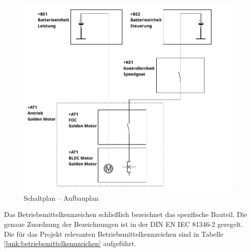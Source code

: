 \begin{figure}[!ht]
	\begin{center}
		\includegraphics[width=1\textwidth]{img/3_schaltplan/sp_aufbauplan_1.png}
		\caption{Schaltplan – Aufbauplan}
		\label{img_3_2:aufbauplan:1}
	\end{center}
\end{figure}


Das Betriebsmittelkennzeichen schließlich bezeichnet das spezifische Bauteil. Die genaue Zuordnung der Bezeichnungen ist in der DIN EN IEC 81346-2 geregelt. Die für das Projekt relevanten Betriebsmittelkennzeichen sind in Tabelle \ref{bmk:betriebsmittelkennzeichen} aufgeführt.

